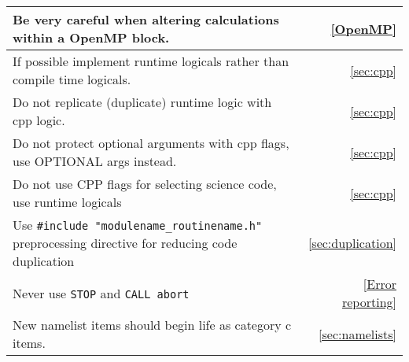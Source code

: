 \begin{tabular}{|l|r|}
Be very careful when altering calculations within a OpenMP block. & \ref{OpenMP} \\ \hline
If possible implement runtime logicals rather than compile time logicals. & \ref{sec:cpp} \\ \hline
Do not replicate (duplicate) runtime logic with cpp logic. & \ref{sec:cpp} \\ \hline
Do not protect optional arguments with cpp flags, use OPTIONAL args instead. & \ref{sec:cpp} \\ \hline
Do not use CPP flags for selecting science code, use runtime logicals & \ref{sec:cpp} \\ \hline
Use \verb|#include "modulename_routinename.h"| preprocessing directive for reducing code duplication & \ref{sec:duplication} \\ \hline
Never use \verb|STOP| and \verb|CALL abort|  & \ref{Error reporting} \\ \hline
New namelist items should begin life as category c items. & \ref{sec:namelists} \\ \hline
\end{tabular}
